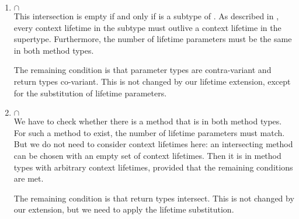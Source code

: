 \begin{enumerate}
\item {} $\cap$ \\
This intersection is empty if and only if  is a subtype of .
As described in , every context lifetime in the subtype must outlive a context lifetime in the supertype.
Furthermore, the number of lifetime parameters must be the same in both method types.

The remaining condition is that parameter types are contra-variant and return types co-variant.
This is not changed by our lifetime extension, except for the substitution of lifetime parameters.

\item {} $\cap$ \\
We have to check whether there is a method that is in both method types.
For such a method to exist, the number of lifetime parameters must match.
But we do not need to consider context lifetimes here:
an intersecting method can be chosen with an empty set of context lifetimes.
Then it is in method types with arbitrary context lifetimes, provided that the remaining conditions are met.

The remaining condition is that return types intersect.
This is not changed by our extension, but we need to apply the lifetime substitution.
\end{enumerate}
